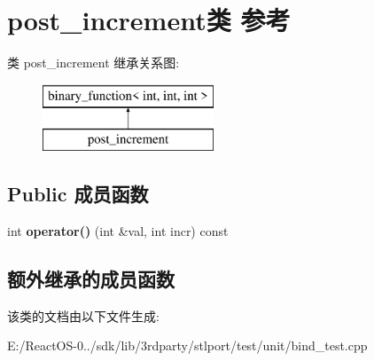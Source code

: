 \hypertarget{classpost__increment}{}\section{post\+\_\+increment类 参考}
\label{classpost__increment}
类 post\+\_\+increment 继承关系图\+:\begin{figure}[H]
\begin{center}
\leavevmode
\includegraphics[height=2.000000cm]{classpost__increment}
\end{center}
\end{figure}
\subsection*{Public 成员函数}
\begin{DoxyCompactItemize}
\item 
\mbox{\label{classpost__increment_ac9f77a36d53c602c2aa46d137f3bf79d}} 
int {\bfseries operator()} (int \&val, int incr) const
\end{DoxyCompactItemize}
\subsection*{额外继承的成员函数}


该类的文档由以下文件生成\+:\begin{DoxyCompactItemize}
\item 
E\+:/\+React\+O\+S-\/0../sdk/lib/3rdparty/stlport/test/unit/bind\+\_\+test.\+cpp\end{DoxyCompactItemize}

